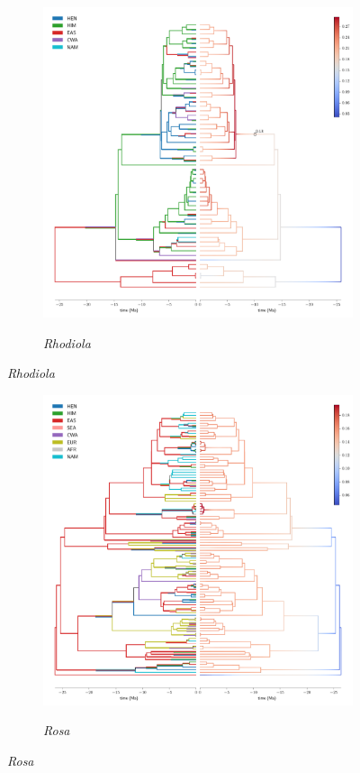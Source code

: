 \begin{figure}
  \ContinuedFloat
\begin{subfigure}{\textwidth}
\centering
\includegraphics[width=.99\linewidth]{figures/Rhodiola-supfig.pdf}
\label{fig:allium}
\caption{\textit{Rhodiola}}
\end{subfigure}
\end{figure}

\begin{figure}
  \ContinuedFloat
\begin{subfigure}{\textwidth}
\centering
\includegraphics[width=.99\linewidth]{figures/Rosa-supfig.pdf}
\label{fig:allium}
\caption{\textit{Rosa}}
\end{subfigure}
\end{figure}

